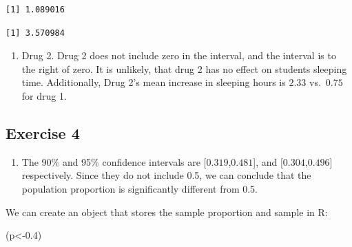 \documentclass[
  letterpaper,
  DIV=11,
  numbers=noendperiod]{scrreprt}
\newenvironment{Shaded}{\begin{snugshade}}{\end{snugshade}}
\newcommand{\DecValTok}[1]{\textcolor[rgb]{0.68,0.00,0.00}{#1}}
\newcommand{\FloatTok}[1]{\textcolor[rgb]{0.68,0.00,0.00}{#1}}
\newcommand{\FunctionTok}[1]{\textcolor[rgb]{0.28,0.35,0.67}{#1}}
\newcommand{\NormalTok}[1]{\textcolor[rgb]{0.00,0.23,0.31}{#1}}
\newcommand{\OtherTok}[1]{\textcolor[rgb]{0.00,0.23,0.31}{#1}}
\newcommand{\SpecialCharTok}[1]{\textcolor[rgb]{0.37,0.37,0.37}{#1}}
\providecommand{\tightlist}{%
  \setlength{\itemsep}{0pt}\setlength{\parskip}{0pt}}\usepackage{longtable,booktabs,array}
\begin{document}
\begin{verbatim}
[1] 1.089016
\end{verbatim}

\begin{Shaded}
\end{Shaded}

\begin{verbatim}
[1] 3.570984
\end{verbatim}

\begin{enumerate}
\def\labelenumi{\arabic{enumi}.}
\setcounter{enumi}{2}
\tightlist
\item
  Drug 2. Drug 2 does not include zero in the interval, and the interval
  is to the right of zero. It is unlikely, that drug 2 has no effect on
  students sleeping time. Additionally, Drug 2's mean increase in
  sleeping hours is \(2.33\) vs.~\(0.75\) for drug 1.
\end{enumerate}

\hypertarget{exercise-4-11}{%
\subsection*{Exercise 4}\label{exercise-4-11}}

\begin{enumerate}
\def\labelenumi{\arabic{enumi}.}
\tightlist
\item
  The 90\% and 95\% confidence intervals are {[}\(0.319\),\(0.481\){]},
  and {[}\(0.304\),\(0.496\){]} respectively. Since they do not include
  0.5, we can conclude that the population proportion is significantly
  different from 0.5.
\end{enumerate}

We can create an object that stores the sample proportion and sample in
R:

\begin{Shaded}
\begin{Highlighting}[numbers=left,,]
\NormalTok{(p}\OtherTok{\textless{}{-}}\FloatTok{0.4}\NormalTok{)}
\end{Highlighting}
\end{Shaded}
\end{document}
